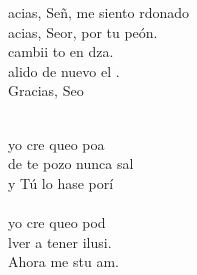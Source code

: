 \begin{cancion}%
	\begin{chorus}%
	acias, Señ, me siento rdonado\\
	acias, Seor, por tu peón.\\
	cambii to en dza.\\
	alido de nuevo el .\\
	Gracias, Seo  \\
	\end{chorus}%
	\jump\\
	yo cre queo poa\\
	de te pozo nunca sal\\
	y Tú lo hase porí\\
\jump\\
	yo cre queo pod\\
	lver a tener ilusi.\\
	Ahora me stu am. \\
\end{cancion}%
